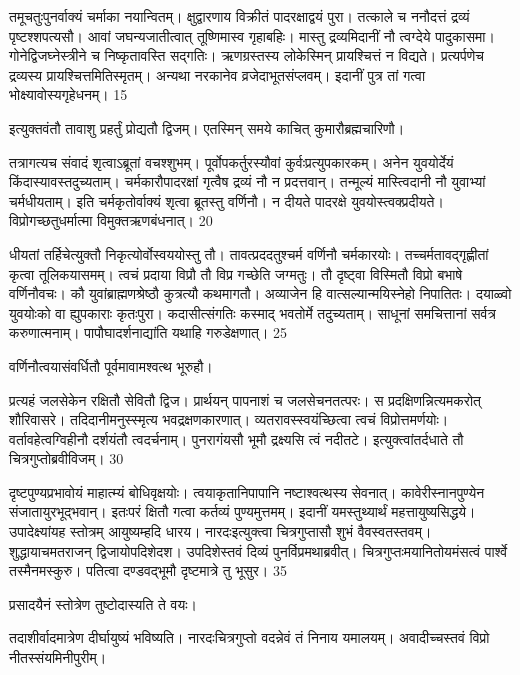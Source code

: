 तमूचतुःपुनर्वाक्यं चर्माका नयान्वितम्।
क्षुद्वारणाय विक्रीतं पादरक्षाद्वयं पुरा।
तत्काले च ननौदत्तं द्रव्यं पृष्टश्शपत्यसौ।
आवां जघन्यजातीत्वात् तूष्णिमास्व गृहाबहिः।
मास्तु द्रव्यमिदानीं नौ त्वग्देये पादुकासमा।
गोनेद्विजघ्नेस्त्रीने च निष्कृतावस्ति सद्गतिः।
ऋणग्रस्तस्य लोकेस्मिन् प्रायश्चित्तं न विद्यते।
प्रत्यर्पणेच द्रव्यस्य प्रायश्चित्तमितिस्मृतम्।
अन्यथा नरकानेव व्रजेदाभूतसंप्लवम्।
इदानीं पुत्र तां गत्वा भोक्ष्यावोस्यगृहेधनम्।
15

इत्युक्तवंतौ तावाशु प्रहर्तुं प्रोद्यतौ द्विजम्।
एतस्मिन् समये काचित् कुमारौब्रह्मचारिणौ।

तत्रागत्यच संवादं शृत्वाऽब्रूतां वचश्शुभम्।
पूर्वोपकर्तुरस्यौवां कुर्वःप्रत्युपकारकम्।
अनेन युवयोर्देयं किंदास्यावस्तदुच्यताम्।
चर्मकारौपादरक्षां गृत्वैष द्रव्यं नौ न प्रदत्तवान्।
तन्मूल्यं मास्त्विदानी नौ युवाभ्यां चर्मधीयताम्।
इति चर्मकृतोर्वाक्यं शृत्वा ब्रूतस्तु वर्णिनौ।
न दीयते पादरक्षे युवयोस्त्वक्प्रदीयते।
विप्रोगच्छतुधर्मात्मा विमुक्तऋणबंधनात्।
20

धीयतां तर्हिचेत्युक्तौ निकृत्योर्वोस्वययोस्तु तौ।
तावत्प्रददतुश्चर्म वर्णिनौ चर्मकारयोः।
तच्चर्मतावद्गृह्णीतां कृत्वा तूलिकयासमम्।
त्वचं प्रदाया विप्रौ तौ विप्र गच्छेति जग्मतुः।
तौ दृष्ट्वा विस्मितौ विप्रो बभाषे वर्णिनौवचः।
कौ युवांब्राह्मणश्रेष्ठौ कुत्रत्यौ कथमागतौ।
अव्याजेन हि वात्सल्यान्मयिस्नेहो निपातितः।
दयाळ्वो युवयोःको वा ह्युपकाराः कृतःपुरा।
कदासीत्संगतिः कस्माद् भवतोर्मे तदुच्यताम्।
साधूनां समचित्तानां सर्वत्र करुणात्मनाम्।
पापौघादर्शनाद्यांति यथाहि गरुडेक्षणात्।
25

वर्णिनौत्वयासंवर्धितौ पूर्वमावामश्वत्थ भूरुहौ।

प्रत्यहं जलसेकेन रक्षितौ सेवितौ द्विज।
प्रार्थयन् पापनाशं च जलसेचनतत्परः।
स प्रदक्षिणन्नित्यमकरोत् शौरिवासरे।
तदिदानीमनुस्स्मृत्य भवद्रक्षणकारणात्।
व्यतरावस्स्वयंच्छित्वा त्वचं विप्रोत्तमर्णयोः।
वर्तावहेत्वग्विहीनौ दर्शयंतौ त्वदर्चनाम्।
पुनरागंयसौ भूमौ द्रक्ष्यसि त्वं नदीतटे।
इत्युक्त्वांतर्दधाते तौ चित्रगुप्तोब्रवीविजम्।
30

दृष्टपुण्यप्रभावोयं माहात्म्यं बोधिवृक्षयोः।
त्वयाकृतानिपापानि नष्टाश्वत्थस्य सेवनात्।
कावेरीस्नानपुण्येन संजातायुरभूद्भवान्।
इतःपरं क्षितौ गत्वा कर्तव्यं पुण्यमुत्तमम्।
इदानीं यमस्तुथ्यार्थं महत्तायुष्यसिद्धये।
उपादेक्ष्यांयह स्तोत्रम् आयुष्यम्हदि धारय।
नारदःइत्युक्त्वा चित्रगुप्तासौ शुभं वैवस्वतस्तवम्।
शुद्धायाचमतराजन् द्विजायोपदिशेदश।
उपदिशेस्तवं दिव्यं पुनर्विप्रमथाब्रवीत्।
चित्रगुप्तःमयानितोयमंसत्वं पार्श्वे तस्मैनमस्कुरु।
पतित्वा दण्डवद्भूमौ दृष्टमात्रे तु भूसुर।
35

प्रसादयैनं स्तोत्रेण तुष्टोदास्यति ते वयः।

तदाशीर्वादमात्रेण दीर्घायुष्यं भविष्यति।
नारदःचित्रगुप्तो वदन्नेवं तं निनाय यमालयम्।
अवादीच्चस्तवं विप्रो नीतस्संयमिनीपुरीम्।

